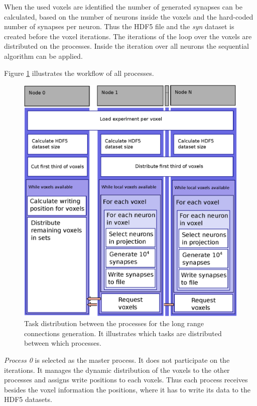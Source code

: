 When the used voxels are identified the number of generated synapses can be calculated, based on the
number of neurons inside the voxels and the hard-coded number of synapses per neuron.
Thus the HDF5 file and the \emph{syn} dataset is created before the voxel iterations.
The iterations of the loop over the voxels are distributed on the processes.
Inside the iteration over all neurons the sequential algorithm can be applied.



Figure \ref{fig:longrangParallel} illustrates the workflow of all processes.
\begin{figure}[ht!]
\centering
\includegraphics[scale=0.5]{pictures/longRange_parallelAlg.eps}
\caption{Task distribution between the processes for the long range connections generation. It illustrates which tasks are distributed between which processes.}
\label{fig:longrangParallel}
\end{figure}
\emph{Process 0} is selected as the master process. It does not participate on the iterations.
It manages the dynamic distribution of the voxels to the other processes and 
assigns write positions to each voxels. Thus each process receives besides the 
voxel information the positions,
where it has to write its data to the HDF5 datasets.
